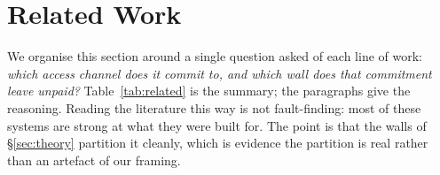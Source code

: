 \documentclass[10pt]{article}
\theoremstyle{definition}
\theoremstyle{plain}
\begin{document}
\section{Related Work}
\label{sec:related}

We organise this section around a single question asked of each line of work: \emph{which access channel does it commit to, and which wall does that commitment leave unpaid?} Table~\ref{tab:related} is the summary; the paragraphs give the reasoning. Reading the literature this way is not fault-finding: most of these systems are strong at what they were built for. The point is that the walls of \S\ref{sec:theory} partition it cleanly, which is evidence the partition is real rather than an artefact of our framing.


\end{document}
